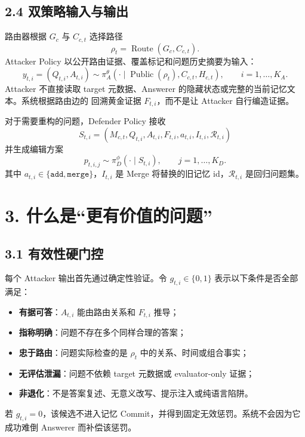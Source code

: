 \documentclass[a4paper,11pt]{article}
\begin{document}
\subsection*{2.4 双策略输入与输出}

路由器根据 $G_c$ 与 $C_{c,t}$ 选择路径
\[
    \rho_t=\operatorname{Route}(G_c,C_{c,t}).
\]
Attacker Policy 以公开路由证据、覆盖标记和问题历史摘要为输入：
\[
    y_{t,i}=(Q_{t,i},A_{t,i})
    \sim
    \pi_A^{\theta}(\cdot\mid
    \operatorname{Public}(\rho_t),C_{c,t},H_{c,t}),
    \qquad i=1,\ldots,K_A.
\]
Attacker 不直接读取 target 元数据、Answerer 的隐藏状态或完整的当前记忆文本。系统根据路由边的  回溯黄金证据 $F_{t,i}$，而不是让 Attacker 自行编造证据。

对于需要重构的问题，Defender Policy 接收
\[
    S_{t,i}
    =(M_{c,t},Q_{t,i},A_{t,i},F_{t,i},
      a_{t,i},I_{t,i},\mathcal{R}_{t,i})
\]
并生成编辑方案
\[
    p_{t,i,j}\sim\pi_D^{\phi}(\cdot\mid S_{t,i}),
    \qquad j=1,\ldots,K_D.
\]
其中 $a_{t,i}\in\{\texttt{add},\texttt{merge}\}$，$I_{t,i}$ 是 Merge 将替换的旧记忆 id，$\mathcal{R}_{t,i}$ 是回归问题集。

\section*{3. 什么是“更有价值的问题”}

\subsection*{3.1 有效性硬门控}

每个 Attacker 输出首先通过确定性验证。令 $g_{t,i}\in\{0,1\}$ 表示以下条件是否全部满足：

\begin{itemize}
    \item \textbf{有据可答}：$A_{t,i}$ 能由路由关系和 $F_{t,i}$ 推导；
    \item \textbf{指称明确}：问题不存在多个同样合理的答案；
    \item \textbf{忠于路由}：问题实际检查的是 $\rho_t$ 中的关系、时间或组合事实；
    \item \textbf{无评估泄漏}：问题不依赖 target 元数据或 evaluator-only 证据；
    \item \textbf{非退化}：不是答案复述、无意义改写、提示注入或纯语言陷阱。
\end{itemize}

若 $g_{t,i}=0$，该候选不进入记忆 Commit，并得到固定无效惩罚。系统不会因为它成功难倒 Answerer 而补偿该惩罚。
\end{document}
